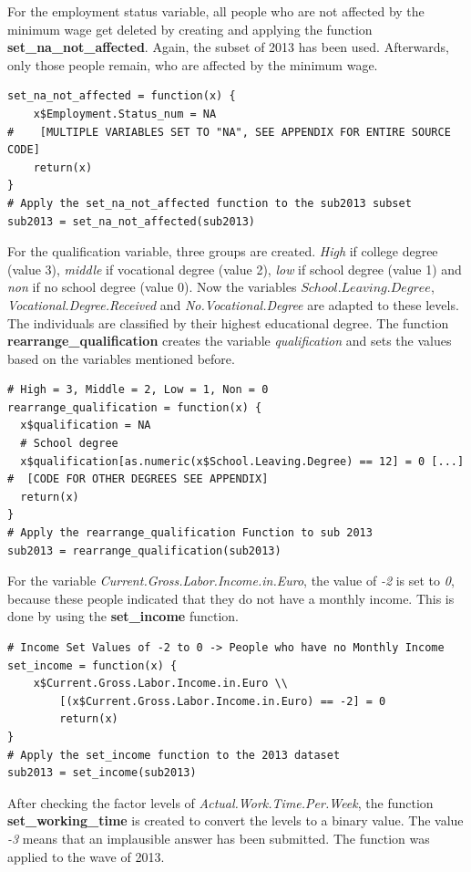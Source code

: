 \documentclass[a4paper]{article}
\begin{document}
For the employment status variable, all people who are not affected by the minimum wage get deleted by creating and applying the function \textbf{set\_na\_not\_affected}. Again, the subset of 2013 has been used. Afterwards, only those people remain, who are affected by the minimum wage.
\begin{lstlisting}
set_na_not_affected = function(x) {
    x$Employment.Status_num = NA
#    [MULTIPLE VARIABLES SET TO "NA", SEE APPENDIX FOR ENTIRE SOURCE CODE]
    return(x)
}
# Apply the set_na_not_affected function to the sub2013 subset
sub2013 = set_na_not_affected(sub2013)
\end{lstlisting}
For the qualification variable, three groups are created. \textit{High} if college degree (value 3), \textit{middle} if vocational degree (value 2), \textit{low} if school degree (value 1) and \textit{non} if no school degree (value 0). Now the variables $School.Leaving.Degree$, \textit{Vocational.Degree.Received} and \textit{No.Vocational.Degree} are adapted to these levels. The individuals are classified by their highest educational degree. The function \textbf{rearrange\_qualification} creates the variable \textit{qualification} and sets the values based on the variables mentioned before.
\begin{lstlisting}
# High = 3, Middle = 2, Low = 1, Non = 0 
rearrange_qualification = function(x) {
  x$qualification = NA
  # School degree
  x$qualification[as.numeric(x$School.Leaving.Degree) == 12] = 0 [...]
#  [CODE FOR OTHER DEGREES SEE APPENDIX]
  return(x)
}
# Apply the rearrange_qualification Function to sub 2013
sub2013 = rearrange_qualification(sub2013)

\end{lstlisting}
For the variable \textit{Current.Gross.Labor.Income.in.Euro}, the value of \textit{-2} is set to \textit{0}, because these people indicated that they do not have a monthly income. This is done by using the \textbf{set\_income} function.
\begin{lstlisting}
# Income Set Values of -2 to 0 -> People who have no Monthly Income
set_income = function(x) {
	x$Current.Gross.Labor.Income.in.Euro \\
		[(x$Current.Gross.Labor.Income.in.Euro) == -2] = 0
    	return(x)
}
# Apply the set_income function to the 2013 dataset
sub2013 = set_income(sub2013)
\end{lstlisting}
After checking the factor levels of \textit{Actual.Work.Time.Per.Week}, the function \textbf{set\_working\_time} is created to convert the levels to a binary value. The value \textit{-3} means that an implausible answer has been submitted. The function was applied to the wave of 2013. 
\end{document}
